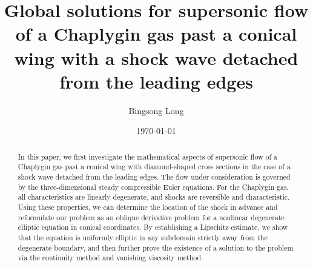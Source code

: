 \documentclass[reqno,12pt]{amsart}
\numberwithin{equation}{section}
\begin{document}
	
	\title[Supersonic flow of past a conical body]{Global solutions for supersonic flow of a Chaplygin gas past a conical wing with a shock wave detached from the leading edges}
	
    
    \author{Bingsong Long}	

\address[Bingsong Long]{School of Mathematics and Statistics, Huanggang Normal University, Hubei 438000, China}	

	

		
	\date{\today}
	
	\begin{abstract}
In this paper, we first investigate the mathematical aspects of supersonic flow of a Chaplygin gas past a conical wing with diamond-shaped cross sections in the case of a shock wave detached from the leading edges. The flow under consideration is governed by the three-dimensional steady compressible Euler equations. For the Chaplygin gas, all characteristics are linearly degenerate, and shocks are reversible and characteristic. Using these properties, we can determine the location of the shock in advance and reformulate our problem as an oblique derivative problem for a nonlinear degenerate elliptic equation in conical coordinates. By establishing a Lipschitz estimate, we show that the equation is uniformly elliptic in any subdomain strictly away from the degenerate boundary, and then further prove the existence of a solution to the problem via the continuity method and vanishing viscosity method.
	\end{abstract}
	
	\allowbreak
	\allowdisplaybreaks	
	\maketitle
	
	
\end{document}
